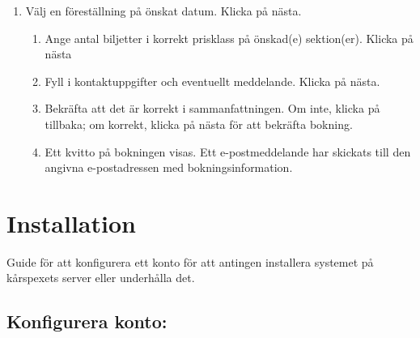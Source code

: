 \documentclass[a4paper, twoside, 11pt, titlepage]{article}
\begin{document}
	\begin{enumerate}
	\item Välj en föreställning på önskat datum. Klicka på nästa.

	\begin{enumerate}
	\item Ange antal biljetter i korrekt prisklass på önskad(e) sektion(er). Klicka på nästa

	\item Fyll i kontaktuppgifter och eventuellt meddelande. Klicka på nästa.

	\item Bekräfta att det är korrekt i sammanfattningen. Om inte, klicka på tillbaka; om korrekt, klicka på nästa för att bekräfta bokning.

	\item Ett kvitto på bokningen visas. Ett e-postmeddelande har skickats till den angivna e-postadressen med bokningsinformation.
		\end{enumerate}
		\end{enumerate}

\clearpage
\section{Installation}


Guide för att konfigurera ett konto för att antingen installera systemet på kårspexets server eller underhålla det.

	\subsection{Konfigurera konto:}
\end{document}
